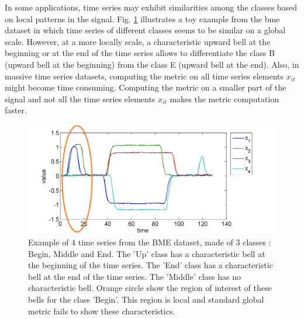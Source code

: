 

In some applications, time series may exhibit similarities among the classes based on local patterns in the signal. Fig. \ref{fig:UMD} illustrates a toy example from the {\sc bme} dataset in which time series of different classes seems to be similar on a global scale. However, at a more locally scale, a characteristic upward bell at the beginning or at the end of the time series allows to differentiate the class B (upward bell at the beginning) from the class E (upward bell at the end). Also, in massive time series datasets, computing the metric on all time series elements $x_{it}$ might become time consuming. Computing the metric on a smaller part of the signal and not all the time series elements $x_{it}$ makes the metric computation faster.

\begin{figure}[h!]
	\centering
	\includegraphics[width=0.8\linewidth]{images/BME_local}
	\caption{Example of 4 time series from the BME dataset, made of 3 classes : Begin, Middle and End. The 'Up' class has a characteristic bell at the beginning of the time series. The 'End' class has a characteristic bell at the end of the time series. The 'Middle' class has no characteristic bell. Orange circle show the region of interest of these bells for the class 'Begin'. This region is local and standard global metric fails to show these characteristics.}
	\label{fig:UMD}
\end{figure}

